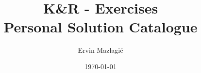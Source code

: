 \documentclass[10pt,a4paper]{article}
\author{Ervin Mazlagi\'c}
\date{\today}
\title{K\&R - Exercises \\ \footnotesize{Personal Solution Catalogue}}
\begin{document}
\maketitle
\vfill{}

\vfill{}
\clearpage
\tableofcontents
\clearpage




\end{document}
